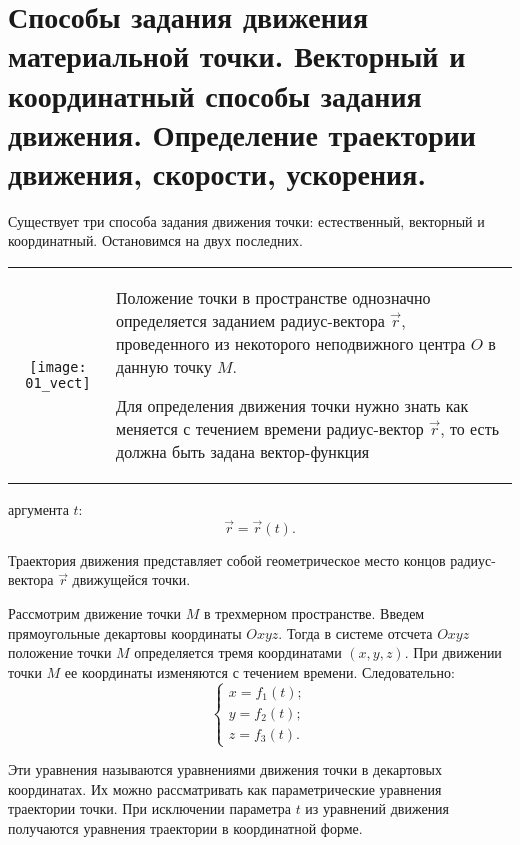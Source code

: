 \chapter{Способы задания движения материальной точки. Векторный и координатный
способы задания движения. Определение траектории движения, скорости, ускорения.}

\vspace*{1em}
Существует три способа задания движения точки: естественный, векторный и
координатный. Остановимся на двух последних.

\begin{table}[h!]
    \begin{tabular}{C{.4}m{.55\textwidth}}
        \texttt{[image: 01\_vect]} &
        Положение точки в пространстве однозначно определяется заданием
        радиус-вектора \( \vec{r} \), проведенного из некоторого неподвижного
        центра \( O \) в данную точку \( M \).
        
        Для определения движения точки нужно знать как меняется с течением
        времени радиус-вектор \( \vec{r} \), то есть должна быть задана
        вектор-функция
    \end{tabular}
\end{table}

аргумента \( t \):
\[
    \vec{r} = \vec{r}(t).
\]

Траектория движения представляет собой геометрическое место концов
радиус-вектора \( \vec{r} \) движущейся точки.


Рассмотрим движение точки \( M \) в трехмерном пространстве. Введем
прямоугольные декартовы координаты \( Oxyz \). Тогда в системе отсчета
\( Oxyz \) положение точки \( M \) определяется тремя координатами
\( (x, y, z) \). При движении точки \( M \) ее координаты изменяются с течением
времени. Следовательно:
\[ \left\{ \begin{array}{l}
    x = f_1(t); \\
    y = f_2(t); \\
    z = f_3(t).
\end{array} \right. \]

Эти уравнения называются уравнениями движения точки в декартовых координатах. Их
можно рассматривать как параметрические уравнения траектории точки. При
исключении параметра \( t \) из уравнений движения получаются уравнения
траектории в координатной форме.

